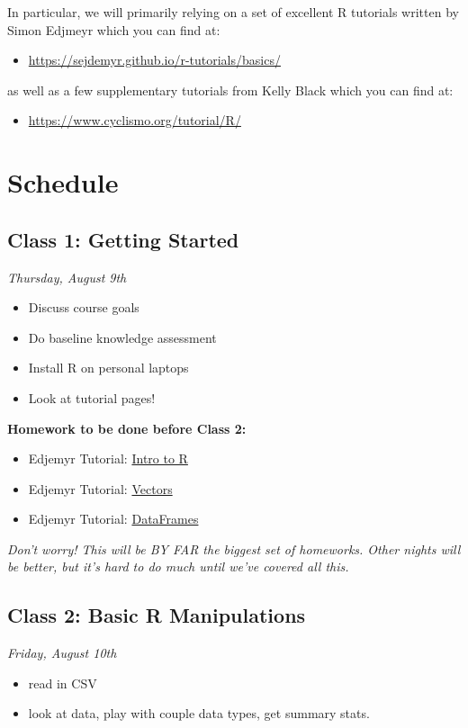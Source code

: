 \documentclass[12pt]{article}
\begin{document}
In particular, we will primarily relying on a set of excellent R tutorials written by Simon Edjmeyr which you can find at:
\begin{itemize}
    \item \href{https://sejdemyr.github.io/r-tutorials/basics/}{https://sejdemyr.github.io/r-tutorials/basics/}
\end{itemize}
as well as a few supplementary tutorials from Kelly Black which you can find at:
\begin{itemize}
    \item \href{https://www.cyclismo.org/tutorial/R/}{https://www.cyclismo.org/tutorial/R/}
\end{itemize}


\section{Schedule}


\subsection*{Class 1: Getting Started}
\emph{Thursday, August 9th}
\begin{itemize}
    \item Discuss course goals
    \item Do baseline knowledge assessment
    \item Install R on personal laptops
    \item Look at tutorial pages!
\end{itemize}

\textbf{Homework to be done before Class 2:}
\begin{itemize}
    \item Edjemyr Tutorial: \href{https://sejdemyr.github.io/r-tutorials/basics/introduction/}{Intro to R}
    \item Edjemyr Tutorial: \href{https://sejdemyr.github.io/r-tutorials/basics/vectors/}{Vectors}
    \item Edjemyr Tutorial: \href{https://sejdemyr.github.io/r-tutorials/basics/dataset-basics/}{DataFrames}
\end{itemize}

\emph{Don't worry! This will be BY FAR the biggest set of homeworks. Other nights will be better, but it's hard to do much until we've covered all this.}


\subsection*{Class 2: Basic R Manipulations}
\emph{Friday, August 10th}
\begin{itemize}
    \item read in CSV
    \item look at data, play with couple data types, get summary stats.
\end{itemize}
\end{document}
